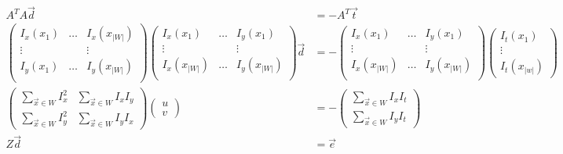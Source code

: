 \begin{align}  \label{eq:klt}
  A^TA\vec d &= -A^T \vec t\\
  \begin{pmatrix}
    I_x(x_1) & \hdots & I_x(x_{|W|}) \\
   \vdots &  & \vdots \\
  I_y(x_1) & \hdots & I_y(x_{|W|}) \\
  \end{pmatrix}
  \begin{pmatrix}
    I_x(x_1) & \hdots &   I_y(x_1)  \\
   \vdots &  & \vdots \\
I_x(x_{|W|})& \hdots & I_y(x_{|W|}) \\
  \end{pmatrix}
\vec d  &= -
  \begin{pmatrix}
    I_x(x_1) & \hdots &   I_y(x_1)  \\
   \vdots &  & \vdots \\
I_x(x_{|W|})& \hdots & I_y(x_{|W|}) \\
  \end{pmatrix}
  \begin{pmatrix}
    I_t(x_1)\\ \vdots \\ I_t(x_{|w|})
  \end{pmatrix}\\
\begin{pmatrix}
\sum_{\vec x\in W}  I_x^2 &\sum_{\vec x\in W} I_xI_y\\ \sum_{\vec x\in
  W} I_y^2 &\sum_{\vec x\in W} I_yI_x
\end{pmatrix}
\begin{pmatrix}
  u \\ v
\end{pmatrix}
 &=-
\begin{pmatrix}
 \sum_{\vec x\in W} I_xI_t\\ \sum_{\vec x\in W}I_yI_t
\end{pmatrix} \\
Z\vec d &= \vec e \label{eq:4}
\end{align}
